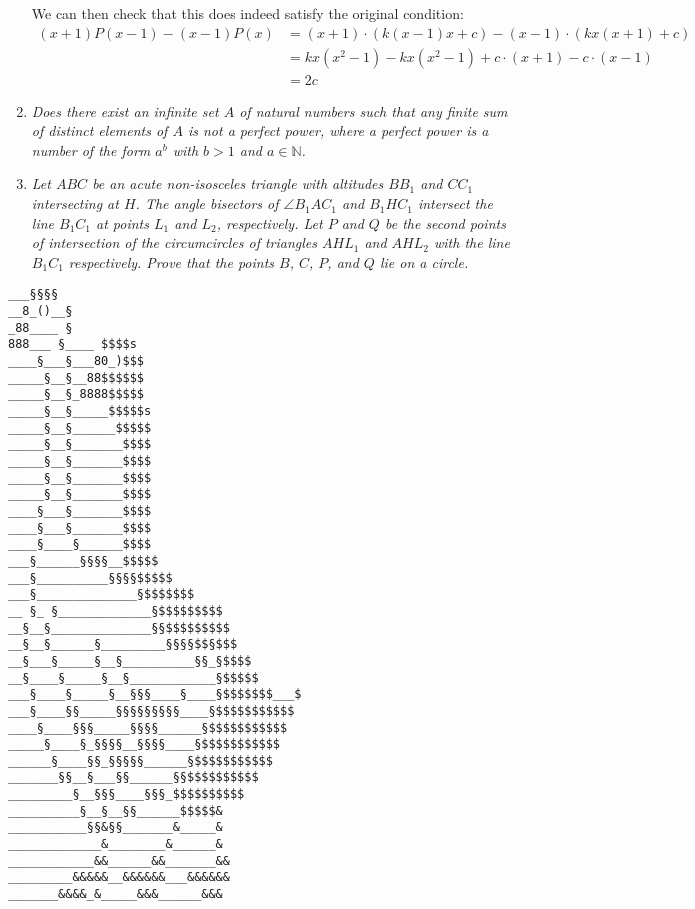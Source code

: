 \documentclass{article}
\begin{document}
\begin{enumerate}[1.]
We can then check that this does indeed satisfy the original condition:
\begin{align*}
  (x + 1)P(x - 1) - (x - 1)P(x) &= (x + 1) \cdot (k(x - 1)x + c) - (x - 1) \cdot (kx(x + 1) + c) \\
  &= kx(x^2 - 1) - kx(x^2 - 1) + c \cdot (x + 1) - c \cdot (x - 1) \\
  &= 2c
\end{align*}

\item %
{\itshape Does there exist an infinite set $A$ of natural numbers such that any finite sum of distinct elements of $A$ is not a perfect power, where a perfect power is a number of the form $a^b$ with $b > 1$ and $a \in \mathbb{N}$.}

\item %
{\itshape Let $ABC$ be an acute non-isosceles triangle with altitudes $BB_1$ and $CC_1$ intersecting at $H$.
The angle bisectors of $\angle B_1AC_1$ and $B_1HC_1$ intersect the line $B_1C_1$ at points $L_1$ and $L_2$, respectively.
Let $P$ and $Q$ be the second points of intersection of the circumcircles of triangles $AHL_1$ and $AHL_2$ with the line $B_1C_1$ respectively.
Prove that the points $B$, $C$, $P$, and $Q$ lie on a circle.}

\end{enumerate}

\vfill
\centering
\tiny
\begin{BVerbatim}
___§§§§
__8_()__§
_88____ §
888___ §____ $$$$s
____§___§___80_)$$$
_____§__§__88$$$$$$
_____§__§_8888$$$$$
_____§__§_____$$$$$s
_____§__§______$$$$$
_____§__§_______$$$$
_____§__§_______$$$$
_____§__§_______$$$$
_____§__§_______$$$$
____§___§_______$$$$
____§___§_______$$$$
____§____§______$$$$
___§______§§§§__$$$$$
___§__________§§§§$$$$$
___§______________§$$$$$$$
__ §_ §_____________§$$$$$$$$$
__§__§______________§§$$$$$$$$$
__§__§______§_________§§§§$$§$$$
__§___§_____§__§__________§§_§$$$$
__§____§_____§__§____________§$$$$$
___§____§_____§__§§§____§____§$$$$$$$___$
___§____§§_____§§§§§§§§§____§$$$$$$$$$$$
____§____§§§_____§§§§______§$$$$$$$$$$$
_____§____§_§§§§__§§§§____§$$$$$$$$$$$
______§____§§_§§§§§______§$$$$$$$$$$$
_______§§__§___§§______§§$$$$$$$$$$
_________§__§§§____§§§_$$$$$$$$$$
__________§__§__§§______$$$$$&
___________§§&§§_______&_____&
_____________&________&______&
____________&&______&&_______&&
_________&&&&&__&&&&&&___&&&&&&
_______&&&&_&_____&&&______&&&
\end{BVerbatim}
\end{document}
